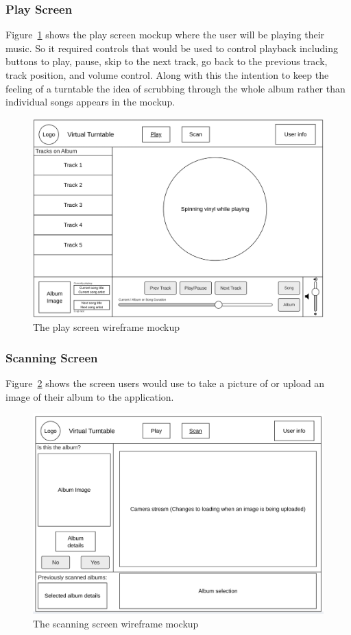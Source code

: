 \subsubsection{Play Screen}
Figure~\ref{fig:play_screen_mockup} shows the play screen mockup where the user will be playing their music. So it required controls that would be used to control playback including buttons to play, pause, skip to the next track, go back to the previous track, track position, and volume control. Along with this the intention to keep the feeling of a turntable the idea of scrubbing through the whole album rather than individual songs appears in the mockup.
\begin{figure} [H]
    \centering
    \includegraphics[width=0.6\linewidth]{figures/play_screen_mockup.png}
    \caption{The play screen wireframe mockup}
    \label{fig:play_screen_mockup}
\end{figure}

\subsubsection{Scanning Screen}
Figure~\ref{fig:scan_screen_mockup} shows the screen users would use to take a picture of or upload an image of their album to the application.
\begin{figure} [H]
    \centering
    \includegraphics[width=0.6\linewidth]{figures/scan_screen_mockup.png}
    \caption{The scanning screen wireframe mockup}
    \label{fig:scan_screen_mockup}
\end{figure}


